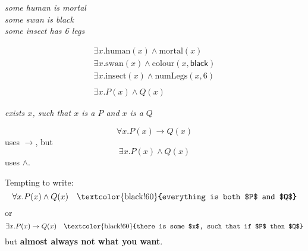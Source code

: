 \documentclass[xetex,aspectratio=169,14pt,hyperref={pdfpagelabels=true,pdflang={en-GB}}]{beamer}
\begin{document}
\begin{frame}[t]

  \begin{center}
    \emph{some human is mortal} \\
    \emph{some swan is black} \\
    \emph{some insect has 6 legs}
  \end{center}

  \begin{displaymath}
    \begin{array}{c}
      \exists x. \mathrm{human}(x) \land \mathrm{mortal}(x) \\
      \exists x. \mathrm{swan}(x) \land \mathrm{colour}(x,\mathsf{black}) \\
      \exists x. \mathrm{insect}(x) \land \mathrm{numLegs}(x,6)\\
      \\
      \exists x. P(x) \land Q(x)
    \end{array}
  \end{displaymath}

  \begin{center}
    \emph{exists $x$, such that $x$ is a $P$ and $x$ is a $Q$}
  \end{center}

\end{frame}

\begin{frame}[t]

  \begin{displaymath}
    \forall x. P(x) \to Q(x)
  \end{displaymath}
  uses $\to$, but
  \begin{displaymath}
    \exists x. P(x) \land Q(x)
  \end{displaymath}
  uses $\land$.

  \pause
  \bigskip

  Tempting to write:
  \begin{displaymath}
    \forall x. P(x) \land Q(x) \quad \textrm{\textcolor{black!60}{everything is both $P$ and $Q$}}
  \end{displaymath}
  or
  \begin{displaymath}
    \exists x. P(x) \to Q(x) \quad \textrm{\textcolor{black!60}{there is some $x$, such that if $P$ then $Q$}}
  \end{displaymath}
  but {\bf almost always not what you want}.
\end{frame}
\end{document}
